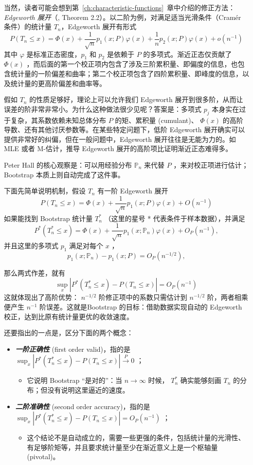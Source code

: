 当然，读者可能会想到第~\ref{ch:characteristic-functions}~章中介绍的修正方法：\emph{Edgeworth 展开}（\cite{hall1992}, Theorem 2.2）。以二阶为例，对满足适当光滑条件（Cramér 条件）的统计量 $T_n$，Edgeworth 展开有形式
\[P(T_n\leq x) = \Phi(x) +\frac{1}{\sqrt{n}}p_1(x;P)\varphi(x) +\frac{1}{n}p_2(x;P)\varphi(x) +o(n^{-1})\]
其中 $\varphi$ 是标准正态密度，$p_1$ 和 $p_2$ 是依赖于 $P$ 的多项式。渐近正态仅贡献了 $\Phi(x)$ ，而后面的第一个校正项内包含了涉及三阶累积量、即偏度的信息，也包含统计量的一阶偏差和曲率；第二个校正项包含了四阶累积量、即峰度的信息，以及统计量的更高阶偏差和曲率等。

假如 $T_n$ 的性质足够好，理论上可以允许我们 Edgeworth 展开到很多阶，从而让误差的阶非常非常小。为什么这种做法很少见呢？答案是：多项式 $p_j$ 本身实在过于复杂，其系数依赖未知总体分布 $P$ 的矩、累积量 (cumulant)、 $\Phi(x)$ 的高阶导数、还有其他讨厌参数等。在某些特定问题下，低阶 Edgeworth 展开确实可以提供非常好的纠偏，但在一般问题中，Edgeworth 展开往往是无能为力的。如 MLE 或者 M-估计，推导 Edgeworth 展开的高阶项比证明渐近正态难得多。

Peter Hall 的核心观察是：可以用经验分布 $\mathbb P_n$ 来代替 $P$ ，来对校正项进行估计；Bootstrap 本质上则自动完成了这件事。

下面先简单说明机制，假设 $T_n$ 有一阶 Edgeworth 展开
\[P(T_n\leq x) = \Phi(x)+\frac{1}{\sqrt{n}}p_1(x;P)\varphi(x)+O(n^{-1})\]
如果能找到 Bootstrap 统计量 $T_n^*$ （这里的星号 * 代表条件于样本数据），并满足
\[
P^*(T_n^*\leq x) = \Phi(x)+\frac{1}{\sqrt{n}}p_1(x;\mathbb P_n)\varphi(x)+O_P(n^{-1}),
\]
并且这里的多项式 $p_1$ 满足对每个 $x$ ，
\[
p_1(x;\mathbb P_n)-p_1(x;P)=O_P(n^{-1/2}),
\]

那么两式作差，就有
\[\sup_x \left| P^*(T_n^*\leq x)-P(T_n\leq x) \right| =O_{P}(n^{-1})\]
这就体现出了高阶优势： $n^{-1/2}$ 阶修正项中的系数只需估计到 $n^{-1/2}$ 阶，两者相乘便产生 $n^{-1}$ 阶误差。这就是Bootstrap 的目标：借助数据实现自动的 Edgeworth 校正，达到比原有统计量更优的收敛速度。

还要指出的一点是，区分下面的两个概念：

\begin{itemize}
\tightlist
\item
  \textbf{\emph{一阶正确性}} (first order valid)，指的是 $\sup_x \left| P^*(T_n^*\leq x)-P(T_n\leq x) \right| \overset{P}\to 0$ ；

\begin{itemize}
  \tightlist
  \item
    它说明 Bootstrap ``是对的''：当 $n\to\infty$ 时候， $T_n^*$ 确实能够刻画 $T_n$ 的分布；但没有说明这里逼近的速度。
  \end{itemize}
\item
  \textbf{\emph{二阶准确性}} (second order accuracy)，指的是 $\sup_x \left| P^*(T_n^*\leq x)-P(T_n\leq x) \right| =O_P(n^{-1})$ ；

\begin{itemize}
  \tightlist
  \item
    这个结论不是自动成立的，需要一些更强的条件，包括统计量的光滑性、有足够阶矩等，并且要求统计量至少在渐近意义上是一个枢轴量 (pivotal)。
  \end{itemize}
\end{itemize}

